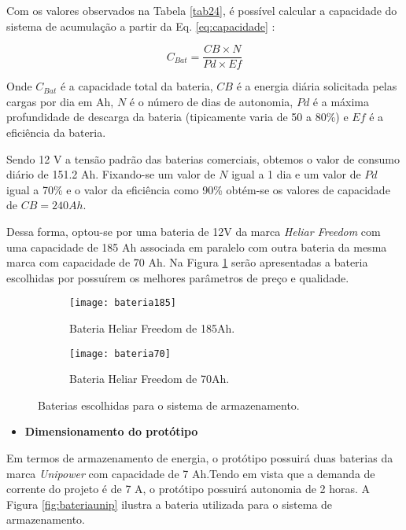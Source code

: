 Com os valores observados na Tabela \ref{tab24}, é possível calcular a capacidade do sistema de acumulação a partir da Eq. \ref{eq:capacidade} \cite{alan}:

\begin{equation}
    C_{Bat} = \frac{CB \times N}{Pd \times Ef}
    \label{eq:capacidade}
\end{equation}




Onde $C_{Bat}$ é a capacidade total da bateria, $CB$ é a energia diária solicitada pelas cargas por dia em Ah, $N$ é o número de dias de autonomia, $Pd$ é a máxima profundidade de descarga da bateria (tipicamente varia de 50 a 80\%) e $Ef$ é a eficiência da bateria.

Sendo 12 V a tensão padrão das baterias comerciais, obtemos o valor de consumo diário de 151.2 Ah. Fixando-se um valor de $N$ igual a 1 dia e um valor de $Pd$ igual a 70\% e o valor da eficiência como 90\% obtém-se os valores de capacidade de $CB = 240 Ah$. 


Dessa forma, optou-se por uma bateria de 12V da marca \textit{Heliar Freedom} com uma capacidade de 185 Ah associada em paralelo com outra bateria da mesma marca com capacidade de 70 Ah. Na Figura \ref{fig:bateria} serão apresentadas a bateria escolhidas por possuírem os melhores parâmetros de preço e qualidade.


\begin{figure}[H]

    \centering
      \begin{subfigure}{0.45\textwidth}
        \texttt{[image: bateria185]}
        \caption{Bateria Heliar Freedom de 185Ah.}
      \end{subfigure}
      \hfill
      \begin{subfigure}{0.35\textwidth}
        \texttt{[image: bateria70]}
        \caption{Bateria Heliar Freedom de 70Ah.}
      \end{subfigure}
    \caption{Baterias escolhidas para o sistema de armazenamento.}
    \label{fig:bateria}
\end{figure}


    \begin{itemize}
        \item \textbf{Dimensionamento do protótipo}
    \end{itemize}
    
    Em termos de armazenamento de energia, o protótipo possuirá duas baterias da marca \textit{Unipower} com capacidade de 7 Ah.Tendo em vista que a demanda de corrente do projeto é de 7 A, o protótipo possuirá autonomia de 2 horas. A Figura \ref{fig:bateriaunip} ilustra a bateria utilizada para o sistema de armazenamento.
    

